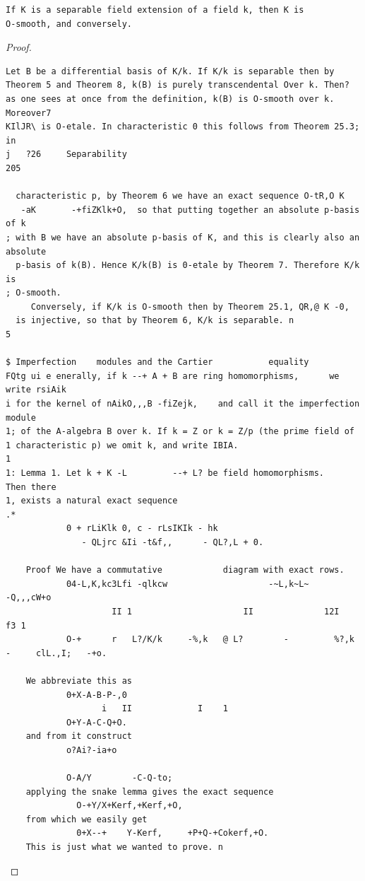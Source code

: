 \begin{theorem}\label{mcrt-auto-theorem-26-9}\uses{}
\begin{verbatim}
If K is a separable field extension of a field k, then K is
O-smooth, and conversely.
\end{verbatim}
\end{theorem}
\begin{proof}
\begin{verbatim}
Let B be a differential basis of K/k. If K/k is separable then by
Theorem 5 and Theorem 8, k(B) is purely transcendental Over k. Then?
as one sees at once from the definition, k(B) is O-smooth over k. Moreover7
KIlJR\ is O-etale. In characteristic 0 this follows from Theorem 25.3; in
j   ?26     Separability                                                                          205

  characteristic p, by Theorem 6 we have an exact sequence O-tR,O K
   -aK       -+fiZKlk+O,  so that putting together an absolute p-basis of k
; with B we have an absolute p-basis of K, and this is clearly also an absolute
  p-basis of k(B). Hence K/k(B) is 0-etale by Theorem 7. Therefore K/k is
; O-smooth.
     Conversely, if K/k is O-smooth then by Theorem 25.1, QR,@ K -0,
  is injective, so that by Theorem 6, K/k is separable. n
5

$ Imperfection    modules and the Cartier           equality
FQtg ui e enerally, if k --+ A + B are ring homomorphisms,      we write rsiAik
i for the kernel of nAikO,,,B -fiZejk,    and call it the imperfection module
1; of the A-algebra B over k. If k = Z or k = Z/p (the prime field of
1 characteristic p) we omit k, and write IBIA.
1
1: Lemma 1. Let k + K -L         --+ L? be field homomorphisms.      Then there
1, exists a natural exact sequence
.*
            0 + rLiKlk 0, c - rLsIKIk - hk
               - QLjrc &Ii -t&f,,      - QL?,L + 0.

    Proof We have a commutative            diagram with exact rows.
            04-L,K,kc3Lfi -qlkcw                    -~L,k~L~            -Q,,,cW+o
                     II 1                      II              12I             f3 1
            O-+      r   L?/K/k     -%,k   @ L?        -         %?,k      -     clL.,I;   -+o.

    We abbreviate this as
            0+X-A-B-P-,0
                   i   II             I    1
            O+Y-A-C-Q+O.
    and from it construct
            o?Ai?-ia+o

            O-A/Y        -C-Q-to;
    applying the snake lemma gives the exact sequence
              O-+Y/X+Kerf,+Kerf,+O,
    from which we easily get
              0+X--+    Y-Kerf,     +P+Q-+Cokerf,+O.
    This is just what we wanted to prove. n
\end{verbatim}
\end{proof}


